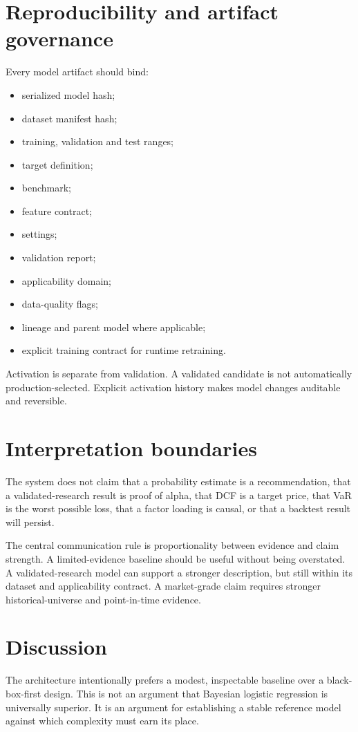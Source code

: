 \documentclass[11pt]{article}
\begin{document}
\section{Reproducibility and artifact governance}
Every model artifact should bind:
\begin{itemize}[itemsep=0.15em]
\item serialized model hash;
\item dataset manifest hash;
\item training, validation and test ranges;
\item target definition;
\item benchmark;
\item feature contract;
\item settings;
\item validation report;
\item applicability domain;
\item data-quality flags;
\item lineage and parent model where applicable;
\item explicit training contract for runtime retraining.
\end{itemize}

Activation is separate from validation. A validated candidate is not automatically production-selected. Explicit activation history makes model changes auditable and reversible.

\section{Interpretation boundaries}
The system does not claim that a probability estimate is a recommendation, that a validated-research result is proof of alpha, that DCF is a target price, that VaR is the worst possible loss, that a factor loading is causal, or that a backtest result will persist.

The central communication rule is proportionality between evidence and claim strength. A limited-evidence baseline should be useful without being overstated. A validated-research model can support a stronger description, but still within its dataset and applicability contract. A market-grade claim requires stronger historical-universe and point-in-time evidence.

\section{Discussion}
The architecture intentionally prefers a modest, inspectable baseline over a black-box-first design. This is not an argument that Bayesian logistic regression is universally superior. It is an argument for establishing a stable reference model against which complexity must earn its place.
\end{document}
